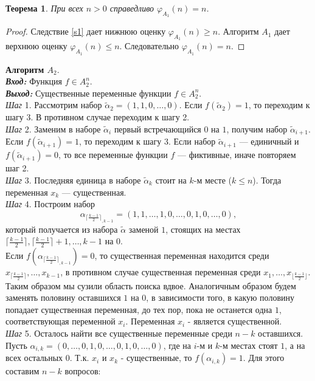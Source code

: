 \documentclass[oneside, final, 14pt]{extreport}
\newtheorem{thm}{Теорема}
\begin{document}
	\begin{thm} 
		При всех $n>0$ справедливо $\varphi_{A_1}(n) = n$.
	\end{thm}
	\begin{proof}
		Следствие \ref{s1} дает нижнюю оценку $\varphi_{A_1}(n) \geq n$. Алгоритм $A_1$ дает верхнюю оценку $\varphi_{A_1}(n) \leq n$. Следовательно 
		$\varphi_{A_1}(n) = n$.
	\end{proof}

	\noindent\textbf{Алгоритм $A_2$}. \\
	\emph{\textbf{Вход:}} Функция $f \in A_2^n$.\\
	\emph{\textbf{Выход:}} Существенные переменные функции $f \in A_2^n$.\\
	\emph{Шаг} 1. Рассмотрим набор $\tilde\alpha_2 = (1, 1, 0, \ldots, 0)$. Если $f(\tilde\alpha_2) = 1$, то переходим к шагу 3. 
	В противном	случае переходим к шагу 2.\\
	\emph{Шаг} 2. Заменим в  наборе $\tilde\alpha_i$ первый встречающийся $0$ на  $1$, получим набор $\tilde\alpha_{i+1}$.
	Если $f(\tilde\alpha_{i+1}) = 1$, то переходим к шагу 3. Если набор
	 $\tilde\alpha_{i+1}$ --- единичный и $f(\tilde\alpha_{i+1}) = 0$, то все переменные функции $f$ --- фиктивные, иначе повторяем шаг 2.\\
	\emph{Шаг} 3. Последняя единица в наборе $\tilde\alpha_k$ стоит на $k$-м месте ($k \leq n$). Тогда переменная  $x_k$ --- существенная.\\
	\emph{Шаг} 4. Построим набор 
	$${\alpha_{\lceil \frac{k-1}{2}\rceil_{,k-1}}} = (1, 1, \ldots, 1, 0, \ldots, 0, 1, 0, \ldots, 0),$$
	 который получается из набора $\tilde\alpha$ заменой $1$, стоящих на местах $\lceil \frac{k-1}{2} \rceil, \lceil \frac{k-1}{2} \rceil + 1, \ldots, k-1$ на $0$. \\
	 Если $f({\alpha_{\lceil\frac{k-1}{2}\rceil_{,k-1}}}) = 0$, то существенная переменная находится среди $x_{\lceil\frac{k-1}{2}\rceil}, \ldots, x_{k-1}$, в противном
	 случае существенная переменная среди $x_1, \ldots, x_{\lfloor \frac{k-1}{2} \rfloor}$. Таким образом мы сузили область поиска вдвое. 
	 Аналогичным образом 
	 будем заменять половину оставшихся $1$ на $0$, в зависимости  того, в какую половину попадает существенная переменная, до тех пор, пока не останется 
	 одна $1$, соответствующая переменной $x_i$. 
	 Переменная $x_i$ - является существенной.\\  
	 \emph{Шаг} 5. Осталось найти все существенные переменные среди $n-k$ оставшихся. Пусть $\alpha_{i,k} = (0, \ldots,0, 1, 0, \ldots, 0, 1, 0, \ldots, 0)$,
	  где на $i$-м и  $k$-м местах стоят $1$, а на всех остальных $0$. Т.к. $x_i$ и $x_k$ - существенные, то  $f(\alpha_{i,k}) = 1$. 
	  Для этого составим $n-k$ вопросов: 
	 
\end{document}
